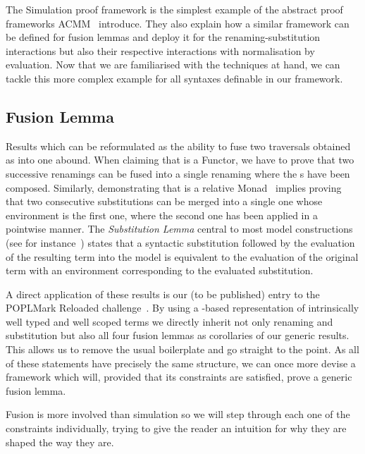 The Simulation proof framework is the simplest example of the abstract
proof frameworks ACMM~\citeyear{allais2017type} introduce. They also
explain how a similar framework can be defined
for fusion lemmas and deploy it for the renaming-substitution interactions
but also their respective interactions with normalisation by evaluation.
Now that we are familiarised with the techniques at hand, we can tackle
this more complex example for all syntaxes definable in our framework.



\subsection{Fusion Lemma}\label{section:fusion}

Results which can be reformulated as the ability to fuse two traversals
obtained as \semrec{} into one abound. When claiming that  is
a Functor, we have to prove that two successive renamings can be fused into
a single renaming where the s have been composed. Similarly,
demonstrating that  is a relative Monad~\cite{JFR4389} implies proving
that two consecutive substitutions can be merged into a single one whose
environment is the first one, where the second one has been applied in a
pointwise manner. The \emph{Substitution Lemma} central
to most model constructions (see for instance~\cite{mitchell1991kripke}) states
that a syntactic substitution followed by the evaluation of the resulting term
into the model is equivalent to the evaluation of the original term with an
environment corresponding to the evaluated substitution.

A direct application of these results is our (to be published) entry to the
POPLMark Reloaded challenge~\citeyear{poplmarkreloaded}. By using a -based
representation of intrinsically well typed and well scoped terms we directly inherit
not only renaming and substitution but also all four fusion lemmas as corollaries
of our generic results. This allows us to remove the usual boilerplate
and go straight to the point.
As all of these statements have precisely the same structure, we can
once more devise a framework which will, provided that its constraints are
satisfied, prove a generic fusion lemma.

Fusion is more involved than simulation so we will step through
each one of the constraints individually, trying to give the reader an intuition
for why they are shaped the way they are.

